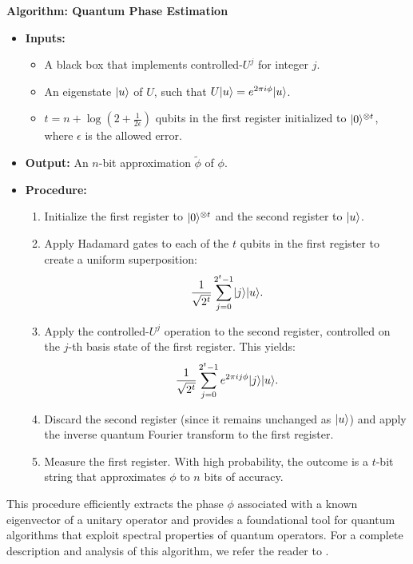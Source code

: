 \documentclass[12pt]{report}
\begin{document}
\vspace{1em}
\noindent\textbf{Algorithm: Quantum Phase Estimation}
\begin{itemize}
  \item \textbf{Inputs:}
    \begin{itemize}
        \item A black box that implements controlled-$U^j$ for integer $j$.
        \item An eigenstate $\lvert u\rangle$ of $U$, such that $U \lvert u\rangle = e^{2\pi i \phi} \lvert u\rangle$.
        \item $t = n + \log(2 + \frac{1}{2\epsilon})$ qubits in the first register initialized to $\lvert0\rangle^{\otimes t}$, where $\epsilon$ is the allowed error.
    \end{itemize}
  \item \textbf{Output:} An $n$-bit approximation $\tilde{\phi}$ of $\phi$.
  \item \textbf{Procedure:}
    \begin{enumerate}
      \item Initialize the first register to $\lvert0\rangle^{\otimes t}$ and the second register to $\lvert u\rangle$.
      \item Apply Hadamard gates to each of the $t$ qubits in the first register to create a uniform superposition:
      \[
      \frac{1}{\sqrt{2^t}} \sum_{j=0}^{2^t - 1} \lvert j\rangle \lvert u\rangle.
      \]
      \item Apply the controlled-$U^j$ operation to the second register, controlled on the $j$-th basis state of the first register. This yields:
      \[
      \frac{1}{\sqrt{2^t}} \sum_{j=0}^{2^t - 1} e^{2\pi i j \phi} \lvert j\rangle \lvert u\rangle.
      \]
      \item Discard the second register (since it remains unchanged as $\lvert u\rangle$) and apply the inverse quantum Fourier transform to the first register.
      \item Measure the first register. With high probability, the outcome is a $t$-bit string that approximates $\phi$ to $n$ bits of accuracy.
    \end{enumerate}
\end{itemize}



\vspace{1em}
This procedure efficiently extracts the phase $\phi$ associated with a known eigenvector of a unitary operator and provides a foundational tool for quantum algorithms that exploit spectral properties of quantum operators. For a complete description and analysis of this algorithm, we refer the reader to \cite{NielsenChuang2010}.
\end{document}
